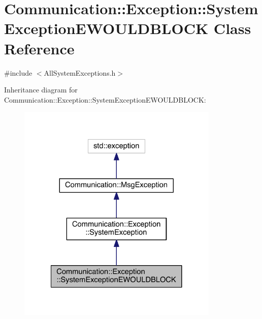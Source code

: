 \hypertarget{class_communication_1_1_exception_1_1_system_exception_e_w_o_u_l_d_b_l_o_c_k}{}\section{Communication\+:\+:Exception\+:\+:System\+Exception\+E\+W\+O\+U\+L\+D\+B\+L\+O\+C\+K Class Reference}
\label{class_communication_1_1_exception_1_1_system_exception_e_w_o_u_l_d_b_l_o_c_k}


{\ttfamily \#include $<$All\+System\+Exceptions.\+h$>$}



Inheritance diagram for Communication\+:\+:Exception\+:\+:System\+Exception\+E\+W\+O\+U\+L\+D\+B\+L\+O\+C\+K\+:\nopagebreak
\begin{figure}[H]
\begin{center}
\leavevmode
\includegraphics[width=272pt]{class_communication_1_1_exception_1_1_system_exception_e_w_o_u_l_d_b_l_o_c_k__inherit__graph}
\end{center}
\end{figure}


